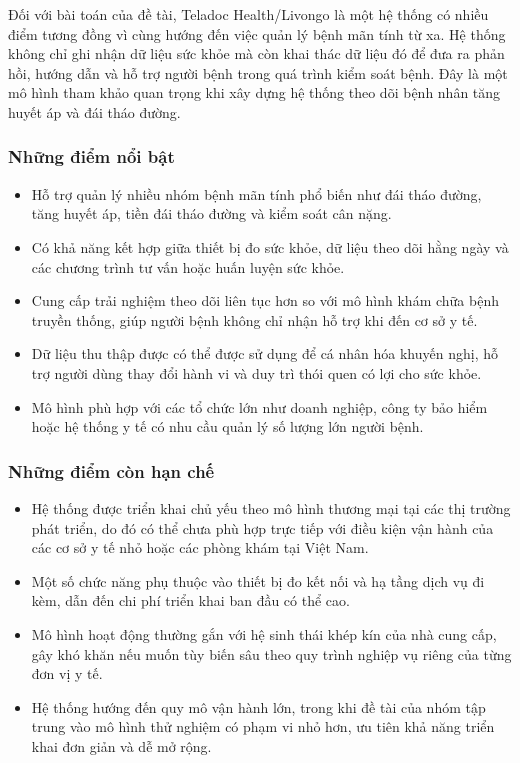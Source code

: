 \par Đối với bài toán của đề tài, Teladoc Health/Livongo là một hệ thống có nhiều điểm tương đồng vì cùng hướng đến việc quản lý bệnh mãn tính từ xa. Hệ thống không chỉ ghi nhận dữ liệu sức khỏe mà còn khai thác dữ liệu đó để đưa ra phản hồi, hướng dẫn và hỗ trợ người bệnh trong quá trình kiểm soát bệnh. Đây là một mô hình tham khảo quan trọng khi xây dựng hệ thống theo dõi bệnh nhân tăng huyết áp và đái tháo đường.

\subsubsection{Những điểm nổi bật}
\begin{itemize}
    \item Hỗ trợ quản lý nhiều nhóm bệnh mãn tính phổ biến như đái tháo đường, tăng huyết áp, tiền đái tháo đường và kiểm soát cân nặng. \cite{teladocChronicCare}
    \item Có khả năng kết hợp giữa thiết bị đo sức khỏe, dữ liệu theo dõi hằng ngày và các chương trình tư vấn hoặc huấn luyện sức khỏe.
    \item Cung cấp trải nghiệm theo dõi liên tục hơn so với mô hình khám chữa bệnh truyền thống, giúp người bệnh không chỉ nhận hỗ trợ khi đến cơ sở y tế.
    \item Dữ liệu thu thập được có thể được sử dụng để cá nhân hóa khuyến nghị, hỗ trợ người dùng thay đổi hành vi và duy trì thói quen có lợi cho sức khỏe.
    \item Mô hình phù hợp với các tổ chức lớn như doanh nghiệp, công ty bảo hiểm hoặc hệ thống y tế có nhu cầu quản lý số lượng lớn người bệnh.
\end{itemize}

\subsubsection{Những điểm còn hạn chế}
\begin{itemize}
    \item Hệ thống được triển khai chủ yếu theo mô hình thương mại tại các thị trường phát triển, do đó có thể chưa phù hợp trực tiếp với điều kiện vận hành của các cơ sở y tế nhỏ hoặc các phòng khám tại Việt Nam.
    \item Một số chức năng phụ thuộc vào thiết bị đo kết nối và hạ tầng dịch vụ đi kèm, dẫn đến chi phí triển khai ban đầu có thể cao.
    \item Mô hình hoạt động thường gắn với hệ sinh thái khép kín của nhà cung cấp, gây khó khăn nếu muốn tùy biến sâu theo quy trình nghiệp vụ riêng của từng đơn vị y tế.
    \item Hệ thống hướng đến quy mô vận hành lớn, trong khi đề tài của nhóm tập trung vào mô hình thử nghiệm có phạm vi nhỏ hơn, ưu tiên khả năng triển khai đơn giản và dễ mở rộng.
\end{itemize}

